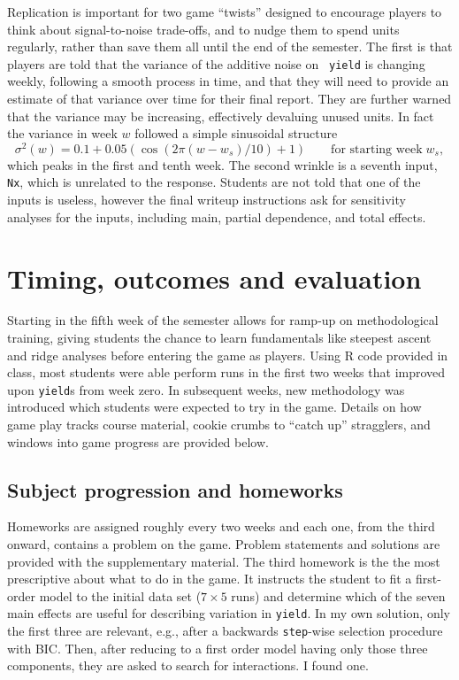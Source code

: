 \documentclass[12pt]{article}
\begin{document}
Replication is important for two game ``twists'' designed to encourage players
to think about signal-to-noise trade-offs, and to nudge them to spend
units regularly, rather than save them all until the end of the semester.  The
first is that players are told that the variance of the additive noise on {\tt
yield} is changing weekly, following a smooth process in time, and that they
will need to provide an estimate of that variance over time for their final
report.  They are further warned that the variance may be increasing,
effectively devaluing unused units.  In fact the variance in
week $w$ followed a simple sinusoidal structure
\[
\sigma^2(w) = 0.1 + 0.05 (\cos(2\pi(w - w_s)/10)+1) \quad\quad \mbox{for starting week} \; w_s,
\]
 which peaks in the first and tenth week.  The second wrinkle is a seventh
input, {\tt Nx}, which is unrelated to the response.  Students are not told
that one of the inputs is useless, however the final writeup instructions ask
for sensitivity analyses for the inputs, including main, partial dependence,
and total effects.

\section{Timing, outcomes and evaluation}
\label{sec:outcomes}

Starting in the fifth week of the semester allows for ramp-up on
methodological training, giving students the chance to learn fundamentals like
steepest ascent and ridge analyses \citep[e.g.,][Chapters
5--6]{myers:etal:2016} before entering the game as players. Using {\sf R} code
provided in class, most students were able perform runs in the first two weeks
that improved upon {\tt yield}s from week zero. In subsequent weeks, new
methodology was introduced which students were expected to try in the game.
Details on how game play tracks course material, cookie crumbs to ``catch up''
stragglers, and windows into game progress are provided below.


\subsection{Subject progression and homeworks}

Homeworks are assigned roughly every two weeks and each one, from the third
onward, contains a problem on the game. Problem statements and solutions are
provided with the supplementary material. The third homework is the the most
prescriptive about what to do in the game.  It instructs the student to fit a
first-order model to the initial data set ($7
\times 5$ runs) and determine which of the seven main effects are useful for
describing variation in {\tt yield}. In my own solution, only the first three
are relevant, e.g., after a backwards {\tt step}-wise selection procedure with
BIC.  Then, after reducing to a first order model having only those three
components, they are asked to search for interactions.  I found one.
\end{document}
